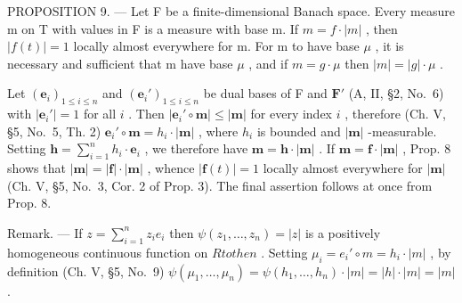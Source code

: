 PROPOSITION 9. --- Let F be a finite-dimensional Banach space. Every measure m on T with values in F is a measure with base \textbar m\textbar. If \(m = f \cdot |m|\) , then \(|f(t)| = 1\) locally almost everywhere for \textbar m\textbar. For m to have base \(\mu\) , it is necessary and sufficient that \textbar m\textbar{} have base \(\mu\) , and if \(m = g \cdot \mu\) then \(|m| = |g| \cdot \mu\) .

Let \((\mathbf{e}_i)_{1 \leqslant i \leqslant n}\) and \((\mathbf{e}_i')_{1 \leqslant i \leqslant n}\) be dual bases of F and \(\mathbf{F}'\) (A, II, §2, No.~6) with \(|\mathbf{e}_i'| = 1\) for all \(i\) . Then \(|\mathbf{e}_i' \circ \mathbf{m}| \leqslant |\mathbf{m}|\) for every index \(i\) , therefore (Ch. V, §5, No.~5, Th. 2) \(\mathbf{e}_i' \circ \mathbf{m} = h_i \cdot |\mathbf{m}|\) , where \(h_i\) is bounded and \(|\mathbf{m}|\) -measurable. Setting \(\mathbf{h} = \sum_{i=1}^{n} h_i \cdot \mathbf{e}_i\) , we therefore have \(\mathbf{m} = \mathbf{h} \cdot |\mathbf{m}|\) . If \(\mathbf{m} = \mathbf{f} \cdot |\mathbf{m}|\) , Prop. 8 shows that \(|\mathbf{m}| = |\mathbf{f}| \cdot |\mathbf{m}|\) , whence \(|\mathbf{f}(t)| = 1\) locally almost everywhere for \(|\mathbf{m}|\) (Ch. V, §5, No.~3, Cor. 2 of Prop. 3). The final assertion follows at once from Prop. 8.

Remark. --- If \(z = \sum_{i=1}^{n} z_i e_i\) then \(\psi(z_1, \ldots, z_n) = |z|\) is a positively homogeneous continuous function on \(R to the n\) . Setting \(\mu_i = e_i' \circ m = h_i \cdot |m|\) , by definition (Ch. V, §5, No.~9) \(\psi(\mu_1, \ldots, \mu_n) = \psi(h_1, \ldots, h_n) \cdot |m| = |h| \cdot |m| = |m|\) .

